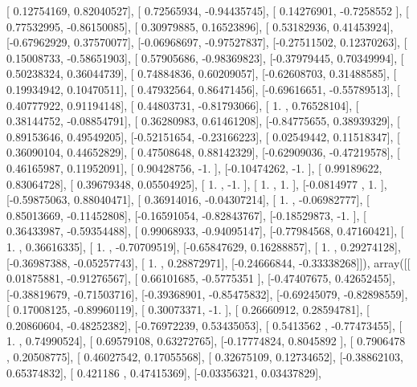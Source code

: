 \documentclass{article}
\begin{document}
       [ 0.12754169,  0.82040527],
       [ 0.72565934, -0.94435745],
       [ 0.14276901, -0.7258552 ],
       [ 0.77532995, -0.86150085],
       [ 0.30979885,  0.16523896],
       [ 0.53182936,  0.41453924],
       [-0.67962929,  0.37570077],
       [-0.06968697, -0.97527837],
       [-0.27511502,  0.12370263],
       [ 0.15008733, -0.58651903],
       [ 0.57905686, -0.98369823],
       [-0.37979445,  0.70349994],
       [ 0.50238324,  0.36044739],
       [ 0.74884836,  0.60209057],
       [-0.62608703,  0.31488585],
       [ 0.19934942,  0.10470511],
       [ 0.47932564,  0.86471456],
       [-0.69616651, -0.55789513],
       [ 0.40777922,  0.91194148],
       [ 0.44803731, -0.81793066],
       [ 1.        ,  0.76528104],
       [ 0.38144752, -0.08854791],
       [ 0.36280983,  0.61461208],
       [-0.84775655,  0.38939329],
       [ 0.89153646,  0.49549205],
       [-0.52151654, -0.23166223],
       [ 0.02549442,  0.11518347],
       [ 0.36090104,  0.44652829],
       [ 0.47508648,  0.88142329],
       [-0.62909036, -0.47219578],
       [ 0.46165987,  0.11952091],
       [ 0.90428756, -1.        ],
       [-0.10474262, -1.        ],
       [ 0.99189622,  0.83064728],
       [ 0.39679348,  0.05504925],
       [ 1.        , -1.        ],
       [ 1.        ,  1.        ],
       [-0.0814977 ,  1.        ],
       [-0.59875063,  0.88040471],
       [ 0.36914016, -0.04307214],
       [ 1.        , -0.06982777],
       [ 0.85013669, -0.11452808],
       [-0.16591054, -0.82843767],
       [-0.18529873, -1.        ],
       [ 0.36433987, -0.59354488],
       [ 0.99068933, -0.94095147],
       [-0.77984568,  0.47160421],
       [ 1.        ,  0.36616335],
       [ 1.        , -0.70709519],
       [-0.65847629,  0.16288857],
       [ 1.        ,  0.29274128],
       [-0.36987388, -0.05257743],
       [ 1.        ,  0.28872971],
       [-0.24666844, -0.33338268]]), array([[ 0.01875881, -0.91276567],
       [ 0.66101685, -0.5775351 ],
       [-0.47407675,  0.42652455],
       [-0.38819679, -0.71503716],
       [-0.39368901, -0.85475832],
       [-0.69245079, -0.82898559],
       [ 0.17008125, -0.89960119],
       [ 0.30073371, -1.        ],
       [ 0.26660912,  0.28594781],
       [ 0.20860604, -0.48252382],
       [-0.76972239,  0.53435053],
       [ 0.5413562 , -0.77473455],
       [ 1.        ,  0.74990524],
       [ 0.69579108,  0.63272765],
       [-0.17774824,  0.8045892 ],
       [ 0.7906478 ,  0.20508775],
       [ 0.46027542,  0.17055568],
       [ 0.32675109,  0.12734652],
       [-0.38862103,  0.65374832],
       [ 0.421186  ,  0.47415369],
       [-0.03356321,  0.03437829],
\end{document}

